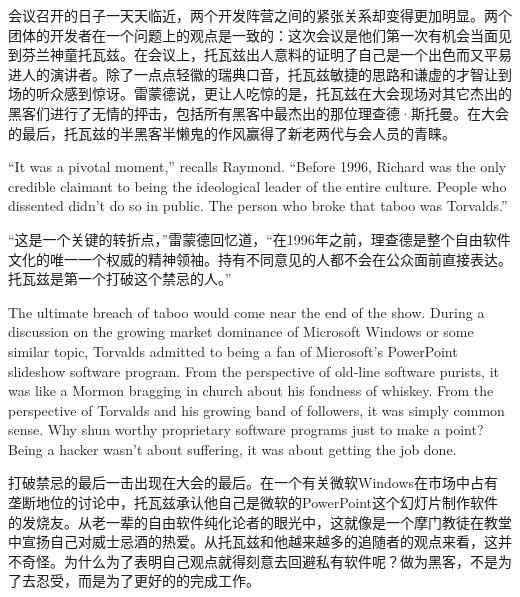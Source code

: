 \ifdefined\chs
会议召开的日子一天天临近，两个开发阵营之间的紧张关系却变得更加明显。两个团体的开发者在一个问题上的观点是一致的：这次会议是他们第一次有机会当面见到芬兰神童托瓦兹。在会议上，托瓦兹出人意料的证明了自己是一个出色而又平易进人的演讲者。除了一点点轻徽的瑞典口音，托瓦兹敏捷的思路和谦虚的才智让到场的听众感到惊讶。雷蒙德说，更让人吃惊的是，托瓦兹在大会现场对其它杰出的黑客们进行了无情的抨击，包括所有黑客中最杰出的那位理查德·斯托曼。在大会的最后，托瓦兹的半黑客半懒鬼的作风赢得了新老两代与会人员的青睐。
\fi

\ifdefined\eng
``It was a pivotal moment,'' recalls Raymond. ``Before 1996, Richard was the only credible claimant to being the ideological leader of the entire culture. People who dissented didn't do so in public. The person who broke that taboo was Torvalds.''
\fi

\ifdefined\chs
``这是一个关键的转折点，''雷蒙德回忆道，``在1996年之前，理查德是整个自由软件文化的唯一一个权威的精神领袖。持有不同意见的人都不会在公众面前直接表达。托瓦兹是第一个打破这个禁忌的人。''
\fi

\ifdefined\eng
The ultimate breach of taboo would come near the end of the show. During a discussion on the growing market dominance of Microsoft Windows or some similar topic, Torvalds admitted to being a fan of Microsoft's PowerPoint slideshow software program. From the perspective of old-line software purists, it was like a Mormon bragging in church about his fondness of whiskey. From the perspective of Torvalds and his growing band of followers, it was simply common sense. Why shun worthy proprietary software programs just to make a point? Being a hacker wasn't about suffering, it was about getting the job done.
\fi

\ifdefined\chs
打破禁忌的最后一击出现在大会的最后。在一个有关微软Windows在市场中占有垄断地位的讨论中，托瓦兹承认他自己是微软的PowerPoint这个幻灯片制作软件的发烧友。从老一辈的自由软件纯化论者的眼光中，这就像是一个摩门教徒在教堂中宣扬自己对威士忌酒的热爱。从托瓦兹和他越来越多的追随者的观点来看，这并不奇怪。为什么为了表明自己观点就得刻意去回避私有软件呢？做为黑客，不是为了去忍受，而是为了更好的的完成工作。
\fi

